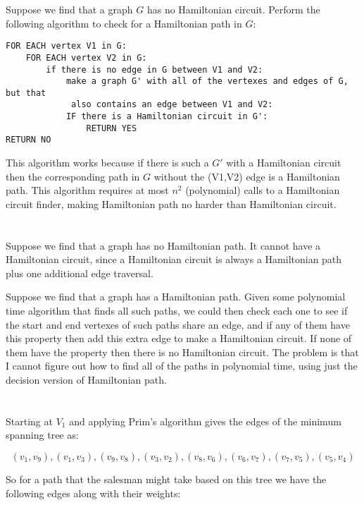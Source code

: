 \documentclass{article}
\begin{document}
\vspace{1em}

Suppose we find that a graph $G$ has no Hamiltonian circuit. Perform the
following algorithm to check for a Hamiltonian path in $G$:

\begin{verbatim}
FOR EACH vertex V1 in G:
    FOR EACH vertex V2 in G:
        if there is no edge in G between V1 and V2:
            make a graph G' with all of the vertexes and edges of G, but that
             also contains an edge between V1 and V2:
            IF there is a Hamiltonian circuit in G':
                RETURN YES
RETURN NO
\end{verbatim}

This algorithm works because if there is such a $G'$ with a Hamiltonian circuit
then the corresponding path in $G$ without the (V1,V2) edge is a Hamiltonian
path. This algorithm requires at most
$n^2$ (polynomial) calls to a Hamiltonian circuit finder, making Hamiltonian
path no harder than Hamiltonian circuit.

\section{}
Suppose we find that a graph has no Hamiltonian path. It cannot have a
Hamiltonian circuit,
since a Hamiltonian circuit is always a Hamiltonian path plus one additional
edge traversal.

\vspace{1em}

Suppose we find that a graph has a Hamiltonian path. Given some polynomial time
algorithm that finds all such paths, we could then check each one to see if
the start and end vertexes of such paths share an edge, and if any of them have
this property then add this extra edge to make a Hamiltonian circuit. If none
of them have the property then there is no Hamiltonian circuit. The
problem is that I cannot figure out 
how to find all of the paths in polynomial time, using just the
decision version of Hamiltonian path.

\section{}
Starting at $V_1$ and applying Prim's algorithm gives the edges of the
minimum spanning tree as: 

\[
(v_1,v_9),(v_1,v_3),(v_9,v_8),(v_3,v_2),(v_8,v_6),
(v_6,v_7),(v_7,v_5),(v_5,v_4)
\]

So for a path that the salesman might
take based on this tree we have the following edges along with their weights:
\end{document}
